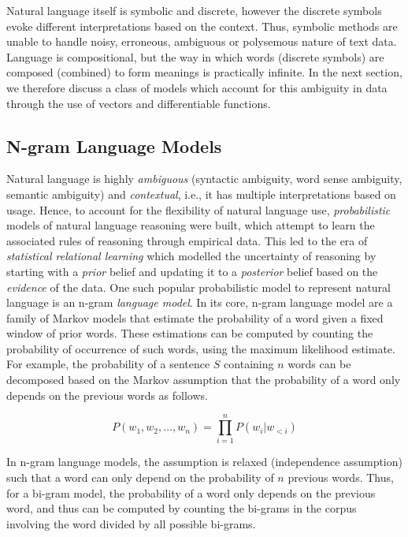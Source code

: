 \documentclass[letterpaper, 12pt]{report}
\begin{document}
Natural language itself is symbolic and discrete, however the discrete symbols evoke different interpretations based on the context. Thus, symbolic methods are unable to handle noisy, erroneous, ambiguous or polysemous nature of text data. Language is compositional, but the way in which words (discrete symbols) are composed (combined) to form meanings is practically infinite. In the next section, we therefore discuss a class of models which account for this ambiguity in data through the use of vectors and differentiable functions.

\subsection{N-gram Language Models}
\label{sec:bg_ngram_lang}

Natural language is highly \textit{ambiguous} (syntactic ambiguity, word sense ambiguity, semantic ambiguity) and \textit{contextual}, i.e., it has multiple interpretations based on usage.
Hence, to account for the flexibility of natural language use, \textit{probabilistic} models of natural language reasoning were built, which attempt to learn the associated rules of reasoning through empirical data.  This led to the era of \textit{statistical relational learning} \citep{glickman2005web, hanprobqa, Domingos2006-zm} which modelled the uncertainty of reasoning by starting with a \textit{prior} belief and updating it to a \textit{posterior} belief based on the \textit{evidence} of the data.
One such popular probabilistic model to represent natural language is an n-gram \textit{language model}. In its core, n-gram language model are a family of Markov models that estimate the probability of a word given a fixed window of prior words. These estimations can be computed by counting the probability of occurrence of such words, using the maximum likelihood estimate. For example, the probability of a sentence $S$ containing $n$ words can be decomposed based on the Markov assumption that the probability of a word only depends on the previous words as follows.

\begin{equation}
  P(w_{1}, w_{2}, \ldots, w_{n}) = \prod_{i=1}^{n}P(w_{i}|w_{<i})
\end{equation}

In n-gram language models, the assumption is relaxed (independence assumption) such that a word can only depend on the probability of $n$ previous words. Thus, for a bi-gram model, the probability of a word only depends on the previous word, and thus can be computed by counting the bi-grams in the corpus involving the word divided by all possible bi-grams.
\end{document}
